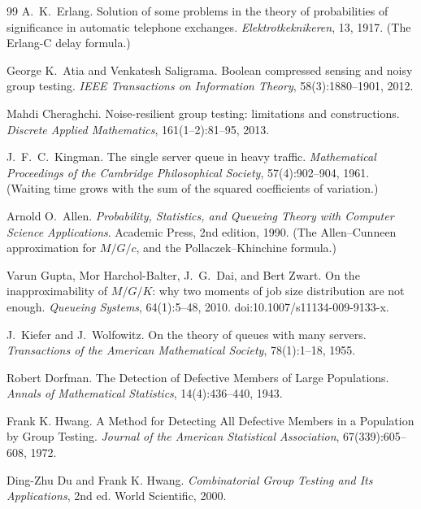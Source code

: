 \documentclass[11pt,a4paper]{article}
\theoremstyle{definition}
\theoremstyle{plain}
\begin{document}
\begin{thebibliography}{99}
A.\ K.\ Erlang.
\newblock Solution of some problems in the theory of probabilities of significance in automatic telephone exchanges.
\newblock \textit{Elektrotkeknikeren}, 13, 1917. (The Erlang-C delay formula.)

George K.\ Atia and Venkatesh Saligrama.
\newblock Boolean compressed sensing and noisy group testing.
\newblock \textit{IEEE Transactions on Information Theory}, 58(3):1880--1901, 2012.

Mahdi Cheraghchi.
\newblock Noise-resilient group testing: limitations and constructions.
\newblock \textit{Discrete Applied Mathematics}, 161(1--2):81--95, 2013.

J.\ F.\ C.\ Kingman.
\newblock The single server queue in heavy traffic.
\newblock \textit{Mathematical Proceedings of the Cambridge Philosophical Society}, 57(4):902--904, 1961. (Waiting time grows with the sum of the squared coefficients of variation.)

Arnold O.\ Allen.
\newblock \textit{Probability, Statistics, and Queueing Theory with Computer Science Applications}.
\newblock Academic Press, 2nd edition, 1990. (The Allen--Cunneen approximation for $M/G/c$, and the Pollaczek--Khinchine formula.)

Varun Gupta, Mor Harchol-Balter, J.\ G.\ Dai, and Bert Zwart.
\newblock On the inapproximability of $M/G/K$: why two moments of job size distribution are not enough.
\newblock \textit{Queueing Systems}, 64(1):5--48, 2010. doi:10.1007/s11134-009-9133-x.

J.\ Kiefer and J.\ Wolfowitz.
\newblock On the theory of queues with many servers.
\newblock \textit{Transactions of the American Mathematical Society}, 78(1):1--18, 1955.

Robert Dorfman.
\newblock The Detection of Defective Members of Large Populations.
\newblock \textit{Annals of Mathematical Statistics}, 14(4):436--440, 1943.

Frank K. Hwang.
\newblock A Method for Detecting All Defective Members in a Population by Group Testing.
\newblock \textit{Journal of the American Statistical Association}, 67(339):605--608, 1972.

Ding-Zhu Du and Frank K. Hwang.
\newblock \textit{Combinatorial Group Testing and Its Applications}, 2nd ed.
\newblock World Scientific, 2000.


\end{thebibliography}
\end{document}
